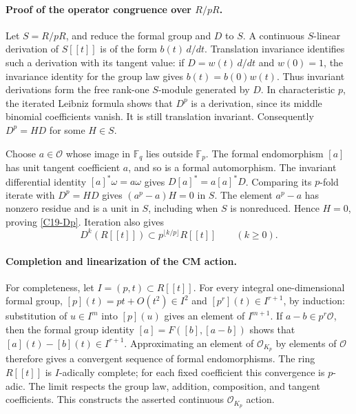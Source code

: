 \documentclass[11pt]{article}
\theoremstyle{definition}\newtheorem{definition}[theorem]{Definition}\newtheorem{remark}[theorem]{Remark}
\begin{document}
\paragraph{Proof of the operator congruence over $R/pR$.}
Let $S=R/pR$, and reduce the formal group and $D$ to $S$.
A continuous $S$-linear derivation of $S[[t]]$ is of the form
$b(t)\,d/dt$.  Translation invariance identifies such a derivation
with its tangent value: if $D=w(t)\,d/dt$ and $w(0)=1$, the
invariance identity for the group law gives
$b(t)=b(0)w(t)$.  Thus invariant derivations form the free
rank-one $S$-module generated by $D$.
In characteristic $p$, the iterated Leibniz formula shows that
$D^p$ is a derivation, since its middle binomial coefficients
vanish.  It is still translation invariant.  Consequently
$D^p=H D$ for some $H\in S$.

Choose $a\in\mathcal O$ whose image in $\mathbb F_q$ lies outside
$\mathbb F_p$.  The formal endomorphism $[a]$ has unit tangent
coefficient $a$, and so is a formal automorphism.  The invariant
differential identity $[a]^*\omega=a\omega$ gives
$D[a]^*=a[a]^*D$.  Comparing its $p$-fold iterate with
$D^p=HD$ gives $(a^p-a)H=0$ in $S$.
The element $a^p-a$ has nonzero residue and is a unit in $S$,
including when $S$ is nonreduced.  Hence $H=0$, proving
\eqref{C19-Dp}.  Iteration also gives
\begin{equation}\label{C19-iterated-Dp}
 D^k(R[[t]])\subset p^{\lfloor k/p\rfloor}R[[t]]
       \qquad(k\geq0).
\end{equation}

\paragraph{Completion and linearization of the CM action.}
For completeness, let $I=(p,t)\subset R[[t]]$.
For every integral one-dimensional formal group,
$[p](t)=pt+O(t^2)\in I^2$ and
$[p^r](t)\in I^{r+1}$, by induction: substitution of
$u\in I^m$ into $[p](u)$ gives an element of $I^{m+1}$.
If $a-b\in p^r\mathcal O$, then the formal group identity
$[a]=F([b],[a-b])$ shows that
$[a](t)-[b](t)\in I^{r+1}$.
Approximating an element of $\mathcal O_{K_p}$ by elements of
$\mathcal O$ therefore gives a convergent sequence of formal
endomorphisms.  The ring $R[[t]]$ is $I$-adically complete;
for each fixed coefficient this convergence is $p$-adic.
The limit respects the group law, addition, composition, and
tangent coefficients.  This constructs the asserted continuous
$\mathcal O_{K_p}$ action.
\end{document}
